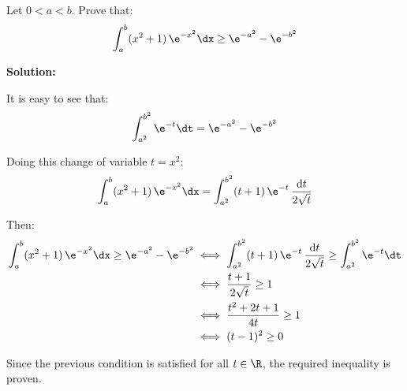 \documentclass[../../main.tex]{subfiles}
\begin{document}
  \begin{shaded}
    Let $0 < a < b$. Prove that:
    $$
    \int_a^b (x^2 + 1) \, \e^{-x^2} \dx \geq \e^{-a^2} - \e^{-b^2}
    $$
  \end{shaded}

  \textbf{Solution:}

  It is easy to see that:
  $$
  \int_{a^2}^{b^2} \e^{-t} \dt = \e^{-a^2} - \e^{-b^2}
  $$

  Doing this change of variable $t = x^2$:
  $$
  \int_a^b (x^2 + 1) \, \e^{-x^2} \dx = \int_{a^2}^{b^2} (t + 1) \, \e^{-t} \, \frac{\text{d}t}{2 \sqrt{t}}
  $$

  Then:
  \begin{equation*}
    \begin{split}
      \int_a^b (x^2 + 1) \, \e^{-x^2} \dx \geq \e^{-a^2} - \e^{-b^2} & \iff
      \int_{a^2}^{b^2} (t + 1) \, \e^{-t} \, \frac{\text{d}t}{2 \sqrt{t}} \geq \int_{a^2}^{b^2} \e^{-t} \dt \\ & \iff
      \frac{t + 1}{2 \sqrt{t}} \geq 1 \\ & \iff
      \frac{t^2 + 2t + 1}{4t} \geq 1 \\ & \iff
      (t - 1)^2 \geq 0
    \end{split}
  \end{equation*}

  Since the previous condition is satisfied for all $t \in \R$, the required inequality is proven.
\end{document}
